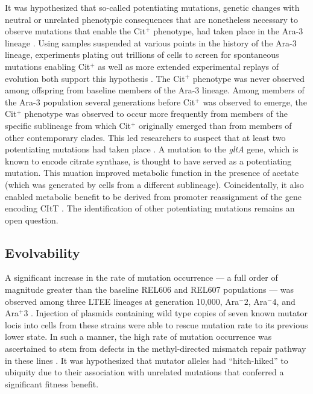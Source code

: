 It was hypothesized that so-called potentiating mutations, genetic changes with neutral or unrelated phenotypic consequences that are nonetheless necessary to observe mutations that enable the Cit$^+$ phenotype, had taken place in the Ara-3 lineage
\cite{Blount2016AContingency}.
Using samples suspended at various points in the history of the Ara-3 lineage, experiments plating out trillions of cells to screen for spontaneous mutations enabling Cit$^+$ as well as more extended experimental replays of evolution both support this hypothesis \cite{Blount2008HistoricalColi.}.
The Cit$^+$ phenotype was never observed among offspring from baseline members of the Ara-3 lineage. 
Among  members  of the Ara-3 population several generations before Cit$^+$ was observed to emerge, the Cit$^+$ phenotype was observed to occur  more frequently from members of the specific sublineage from which Cit$^+$ originally emerged than from members of other  contemporary clades.
This led researchers to suspect that at least two potentiating mutations had taken place \cite{Blount2012GenomicPopulation}.
A mutation to the \textit{gltA} gene, which is known to encode citrate synthase, is thought to have served as a potentiating mutation.
This muation improved metabolic function in the presence of acetate (which was generated by cells from a different sublineage).
Coincidentally, it also enabled metabolic benefit to be derived from promoter reassignment of the gene encoding CItT \cite{Blount2016AContingency}.
The identification of other potentiating mutations remains an open question.

\subsection{Evolvability} \label{sec:evolvability}
A significant increase in the rate of mutation occurrence --- a full order of magnitude greater than the baseline REL606 and REL607 populations --- was observed among three LTEE lineages at generation 10,000, Ara$^-2$, Ara$^-4$, and Ara$^+3$  \cite{Sniegowski1997EvolutionColi}.
Injection of plasmids containing wild type copies of seven known mutator locis into cells from these strains were able to rescue mutation rate to its previous lower state.
In such a manner, the high rate of mutation occurrence was ascertained to stem from defects in the methyl-directed mismatch repair pathway in these lines \cite{Sniegowski1997EvolutionColi}.
It was hypothesized that mutator alleles had ``hitch-hiked'' to ubiquity due to their association with unrelated mutations that conferred a significant fitness benefit.

